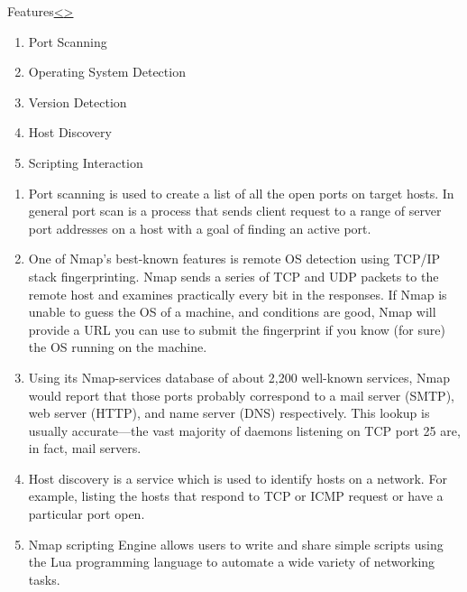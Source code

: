 \documentclass[12pt]{extarticle}
\newenvironment{instructionblock}{\Large\bgroup}{\egroup}
\begin{document}
\pagebreak
\begin{slide}{Features}{\hyperref[slide 1]{\textless}\hyperref[slide 3]{\textgreater}}
	\begin{instructionblock}
		\begin{enumerate}
			\item Port Scanning 
			\item Operating System Detection
			\item Version Detection
			\item Host Discovery
			\item Scripting Interaction
		\end{enumerate}
	\end{instructionblock}
\end{slide}
\begin{enumerate}
	\item 

Port scanning is used to create a list of all the open ports on target hosts. In general port scan is a process that sends client request to a range of server port addresses on a host with a goal of finding an active port.

\item One of Nmap's best-known features is remote OS detection using TCP/IP stack fingerprinting. Nmap sends a series of TCP and UDP packets to the remote host and examines practically every bit in the responses. If Nmap is unable to guess the OS of a machine, and conditions are good, Nmap will provide a URL you can use to submit the fingerprint if you know (for sure) the OS running on the machine. 
\cite{book} 

\item Using its Nmap-services database of about 2,200 well-known services, Nmap would report that those ports probably correspond to a mail server (SMTP), web server (HTTP), and name server (DNS) respectively. This lookup is usually accurate—the vast majority of daemons listening on TCP port 25 are, in fact, mail servers.

\item Host discovery is a service which is used to identify hosts on a network. For example, listing the hosts that respond to TCP or ICMP request or have a particular port open.

\item Nmap scripting Engine allows users to write and share simple scripts using the Lua programming language  to automate a wide variety of networking tasks.
\cite{book} 
\end{enumerate}
\end{document}
